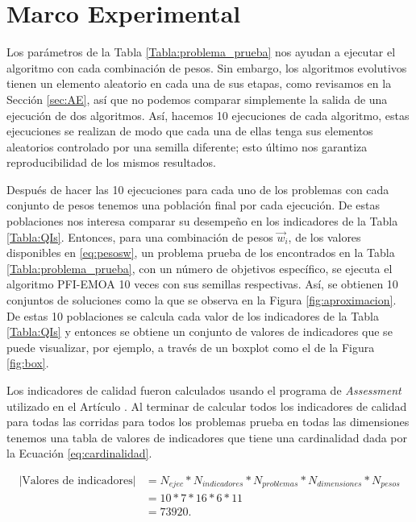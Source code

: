 \section{Marco Experimental} \label{sec:Marco_Exp}


Los parámetros de la Tabla \ref{Tabla:problema_prueba} nos ayudan a ejecutar el algoritmo con cada combinación de pesos. Sin embargo, los algoritmos evolutivos tienen un elemento aleatorio en cada una de sus etapas, como revisamos en la Sección \ref{sec:AE}, así que no podemos comparar simplemente la salida de una ejecución de dos algoritmos. Así, hacemos 10 ejecuciones de cada algoritmo, estas ejecuciones se realizan de modo que cada una de ellas tenga sus elementos aleatorios controlado por una semilla diferente; esto último nos garantiza reproducibilidad de los mismos resultados. 

Después de hacer las 10 ejecuciones para cada uno de los problemas con cada conjunto de pesos tenemos una población final por cada ejecución. De estas poblaciones nos interesa comparar su desempeño en los indicadores de la Tabla \ref{Tabla:QIs}. Entonces, para una combinación de pesos $\vec{w}_i$, de los valores disponibles en \eqref{eq:pesosw}, un problema prueba de los encontrados en la Tabla \ref{Tabla:problema_prueba}, con un número de objetivos específico, se ejecuta el algoritmo PFI-EMOA 10 veces con sus semillas respectivas. Así, se obtienen 10 conjuntos de soluciones como la que se observa en la Figura \ref{fig:aproximacion}. De estas 10 poblaciones se calcula cada valor de los indicadores de la Tabla \ref{Tabla:QIs} y entonces se obtiene un conjunto de valores de indicadores que se puede visualizar, por ejemplo, a través de un boxplot como el de la Figura \ref{fig:box}.

Los indicadores de calidad fueron calculados usando el programa de \emph{Assessment} utilizado en el Artículo \cite{PFI}. Al terminar de calcular todos los indicadores de calidad para todas las corridas para todos los problemas prueba en todas las dimensiones tenemos una tabla de valores de indicadores que tiene una cardinalidad dada por la Ecuación \ref{eq:cardinalidad}. 

\begin{align} \label{eq:cardinalidad}
    |\text{Valores de indicadores}|&=N_{ejec}*N_{indicadores}*N_{problemas}*N_{dimensiones}*N_{pesos} \nonumber\\
    &=10*7*16*6*11 \nonumber \\
    &=73920. 
\end{align}



